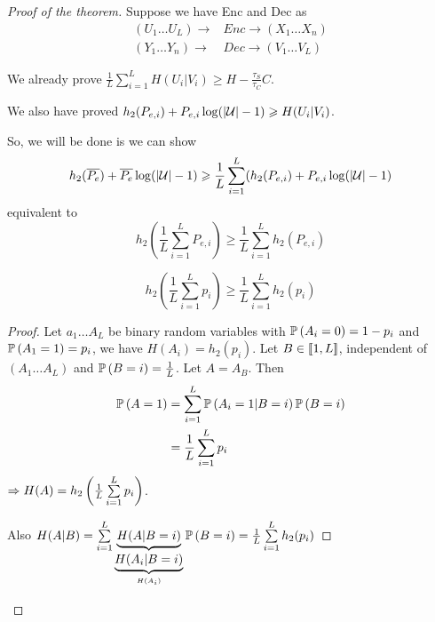 \begin{proof}[Proof of the theorem]
    Suppose we have Enc and Dec as
    \[
        \begin{aligned}
            (U_1\ldots U_L) \to &Enc \to (X_1\ldots X_n)\\
            (Y_1\ldots Y_n) \to &Dec \to (V_1\ldots V_L)
        \end{aligned}   
    \]
    
    We already prove $\frac{1}{L}\sum\limits_{i=1}^L H(U_i \vert V_i) \geqslant H-\frac{\tau_S}{\tau_C} C$.
    
    We also have proved $h_2(P_{e,i}) + P_{e,i}\log(\lvert \mathcal{U}\rvert -1) \geqslant H(U_i \vert V_i)$.
    
    So, we will be done is we can show
    \[
        h_2(\overline{P_e}) + \overline{P_e}\log(\lvert \mathcal{U}\rvert -1) \geqslant \frac{1}{L} \sum\limits_{i=1}^L (h_2(P_{e,i}) + P_{e,i} \log(\left\lvert\mathcal{U}\right\rvert -1)
    \]
    equivalent to
    \[
        h_2\left( \frac{1}{L} \sum\limits_{i=1}^L P_{e,i} \right) \geqslant \frac{1}{L} \sum\limits_{i=1}^L h_2(P_{e,i})
    \]
    \begin{lemma}
        \[
            h_2\left( \frac{1}{L} \sum\limits_{i=1}^L p_i \right) \geqslant \frac{1}{L} \sum\limits_{i=1}^L h_2(p_i)
        \]
    \end{lemma}        
    \begin{proof}
        Let $a_1\ldots A_L$ be binary random variables with $\mathbb{P}\left( A_i = 0 \right) = 1-p_i$ and $\mathbb{P}\left( A_1 = 1 \right) = p_i$, we have $H(A_i) = h_2(p_i)$. Let $B\in \left\llbracket 1,L \right\rrbracket$, independent of $(A_1\ldots A_L)$ and $\mathbb{P}\left( B=i \right) = \frac{1}{L}$. Let $A=A_B$. Then 
        \[
            \begin{aligned}
                \mathbb{P}\left( A = 1 \right) &= \sum\limits_{i=1}^L\mathbb{P}\left( A_i = 1 \vert B=i \right)\mathbb{P}\left( B=i \right)\\
                &= \frac{1}{L} \sum\limits_{i=1}^L p_i
            \end{aligned}                    
        \]
        $\Rightarrow H(A) = h_2\left( \frac{1}{L} \sum\limits_{i=1}^L p_i \right)$.
        
        Also $H(A\vert B) = \sum\limits_{i=1}^L \underbrace{H(A\vert B=i)}_{\underbrace{H(A_i\vert B=i)}_{H(A_i)}}\mathbb{P}\left( B=i \right) = \frac{1}{L}\sum\limits_{i=1}^L h_2(p_i)$
    \end{proof}
\end{proof}










